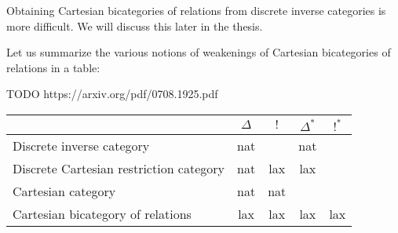Obtaining Cartesian bicategories of relations from discrete inverse categories is more difficult.  We will discuss this later in the thesis.


Let us summarize the various notions of weakenings of Cartesian bicategories of relations in a table:

TODO https://arxiv.org/pdf/0708.1925.pdf

\hfil
\begin{tabular}{l|cccc}
                                                     & $\Delta$          & $!$             & $\Delta^*$         & $!^*$\\
\hline
Discrete inverse category            & nat &  & nat  & \\
Discrete Cartesian restriction category      & nat &  lax  & lax \\
Cartesian category                                      & nat & nat &   \\
Cartesian bicategory of relations & lax  & lax & lax & lax \\
\end{tabular}
